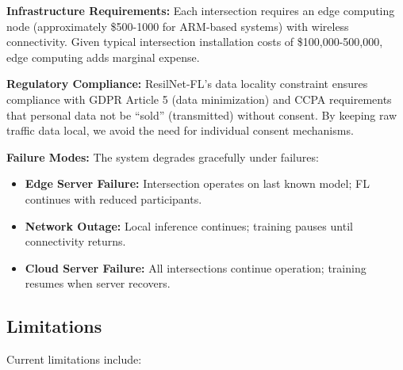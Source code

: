 \documentclass[conference]{IEEEtran}
\begin{document}
\textbf{Infrastructure Requirements:} Each intersection requires an edge computing node (approximately \$500-1000 for ARM-based systems) with wireless connectivity. Given typical intersection installation costs of \$100,000-500,000, edge computing adds marginal expense.

\textbf{Regulatory Compliance:} ResilNet-FL's data locality constraint ensures compliance with GDPR Article 5 (data minimization) and CCPA requirements that personal data not be ``sold'' (transmitted) without consent. By keeping raw traffic data local, we avoid the need for individual consent mechanisms.

\textbf{Failure Modes:} The system degrades gracefully under failures:
\begin{itemize}
    \item \textbf{Edge Server Failure:} Intersection operates on last known model; FL continues with reduced participants.
    \item \textbf{Network Outage:} Local inference continues; training pauses until connectivity returns.
    \item \textbf{Cloud Server Failure:} All intersections continue operation; training resumes when server recovers.
\end{itemize}

\subsection{Limitations}
Current limitations include:
\end{document}

